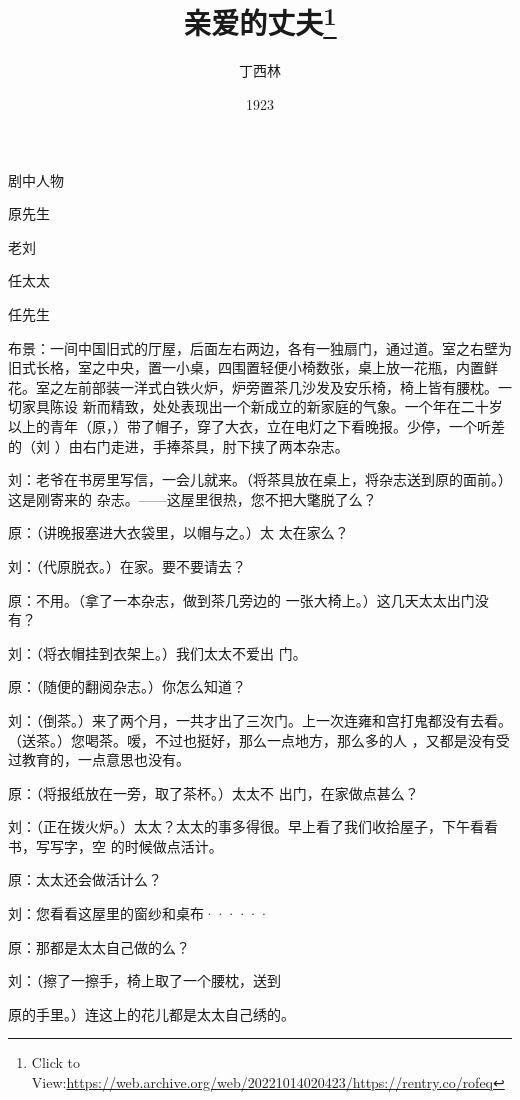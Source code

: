 \documentclass{article}
\title{亲爱的丈夫\footnote{Click to View:\url{https://web.archive.org/web/20221014020423/https://rentry.co/rofeq}}}
\author{丁西林}
\date{1923}
\begin{document}

\maketitle


\Large


﻿剧中人物 


原先生 


老刘 


任太太 


任先生 

布景：一间中国旧式的厅屋，后面左右两边，各有一独扇门，通过道。室之右壁为旧式长格，室之中央，置一小桌，四围置轻便小椅数张，桌上放一花瓶，内置鲜花。室之左前部装一洋式白铁火炉，炉旁置茶几沙发及安乐椅，椅上皆有腰枕。一切家具陈设
\newpage
新而精致，处处表现出一个新成立的新家庭的气象。一个年在二十岁以上的青年（原，）带了帽子，穿了大衣，立在电灯之下看晚报。少停，一个听差的（刘
）由右门走进，手捧茶具，肘下挟了两本杂志。 

刘：老爷在书房里写信，一会儿就来。（将茶具放在桌上，将杂志送到原的面前。）这是刚寄来的
杂志。——这屋里很热，您不把大氅脱了么？ 

原：（讲晚报塞进大衣袋里，以帽与之。）太
太在家么？ 


刘：（代原脱衣。）在家。要不要请去？ 

原：不用。（拿了一本杂志，做到茶几旁边的
一张大椅上。）这几天太太出门没有？ 

刘：（将衣帽挂到衣架上。）我们太太不爱出
门。 


\newpage

原：（随便的翻阅杂志。）你怎么知道？ 

刘：（倒茶。）来了两个月，一共才出了三次门。上一次连雍和宫打鬼都没有去看。（送茶。）您喝茶。嗳，不过也挺好，那么一点地方，那么多的人
，又都是没有受过教育的，一点意思也没有。 

原：（将报纸放在一旁，取了茶杯。）太太不
出门，在家做点甚么？ 

刘：（正在拨火炉。）太太？太太的事多得很。早上看了我们收拾屋子，下午看看书，写写字，空
的时候做点活计。 


原：太太还会做活计么？ 

刘：您看看这屋里的窗纱和桌布······
 


原：那都是太太自己做的么？ 

刘：（擦了一擦手，椅上取了一个腰枕，送到
\newpage

原的手里。）连这上的花儿都是太太自己绣的。 
\end{document}
